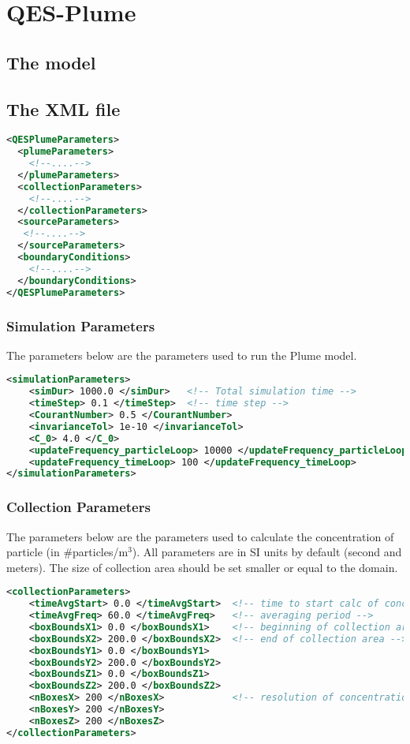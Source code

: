 \chapter{QES-Plume}

\section{The model}

\section{The XML file}

\begin{lstlisting}[language=XML]
<QESPlumeParameters>
  <plumeParameters>
    <!--....-->
  </plumeParameters>
  <collectionParameters>
    <!--....-->
  </collectionParameters>
  <sourceParameters>
   <!--....-->
  </sourceParameters>
  <boundaryConditions>
    <!--....-->
  </boundaryConditions>
</QESPlumeParameters>
\end{lstlisting}

\subsection{Simulation Parameters}

The parameters below are the parameters used to run the Plume model.

\begin{lstlisting}[language=XML]
<simulationParameters>
    <simDur> 1000.0 </simDur>   <!-- Total simulation time -->
    <timeStep> 0.1 </timeStep>  <!-- time step -->
    <CourantNumber> 0.5 </CourantNumber>
    <invarianceTol> 1e-10 </invarianceTol>
    <C_0> 4.0 </C_0>
    <updateFrequency_particleLoop> 10000 </updateFrequency_particleLoop>
    <updateFrequency_timeLoop> 100 </updateFrequency_timeLoop>
</simulationParameters>
\end{lstlisting}

\subsection{Collection Parameters}

The parameters below are the parameters used to calculate the concentration of particle (in \#particles/m$^{3}$). All parameters are in SI units by default (second and meters). The size of collection area should be set smaller or equal to the domain.
\begin{lstlisting}[language=XML]
<collectionParameters>
    <timeAvgStart> 0.0 </timeAvgStart>  <!-- time to start calc of concentration -->
    <timeAvgFreq> 60.0 </timeAvgFreq>   <!-- averaging period -->
    <boxBoundsX1> 0.0 </boxBoundsX1>    <!-- beginning of collection area -->
    <boxBoundsX2> 200.0 </boxBoundsX2>  <!-- end of collection area -->
    <boxBoundsY1> 0.0 </boxBoundsY1>
    <boxBoundsY2> 200.0 </boxBoundsY2>
    <boxBoundsZ1> 0.0 </boxBoundsZ1>
    <boxBoundsZ2> 200.0 </boxBoundsZ2>
    <nBoxesX> 200 </nBoxesX>            <!-- resolution of concentration -->
    <nBoxesY> 200 </nBoxesY>
    <nBoxesZ> 200 </nBoxesZ>
</collectionParameters>
\end{lstlisting}

